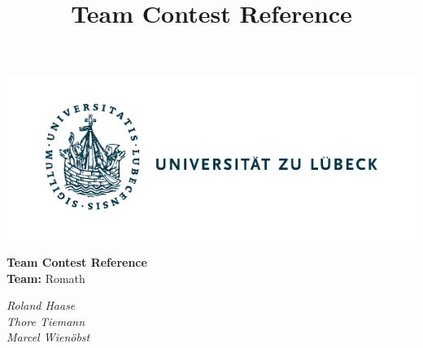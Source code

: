 \documentclass[10pt,a4paper,ngerman,oneside,]{article}
\title{Team Contest Reference}
\author{\university}
\newcommand\teamname{Romath}
\newcommand\teammembers{Roland Haase\\ Thore Tiemann\\ Marcel Wienöbst}
\begin{document}
\vspace{-5mm}
\begin{center}
	\begin{minipage}{0.3\textwidth}
	  \includegraphics[scale=.8,clip,trim=.4cm 0cm 6.4cm 0cm,scale=0.89]{img/logo_uzl.pdf}
    \end{minipage}
	\begin{minipage}{0.35\textwidth}
      \begin{center}
	    \LARGE{\bfseries Team Contest Reference}\\
        \textbf{Team:} {\teamname}
      \end{center}
    \end{minipage}
	\begin{minipage}{0.3\textwidth}
      \flushright
      \itshape\teammembers
    \end{minipage}
\end{center}
\thispagestyle{fancy}
\tableofcontents
\end{document}
